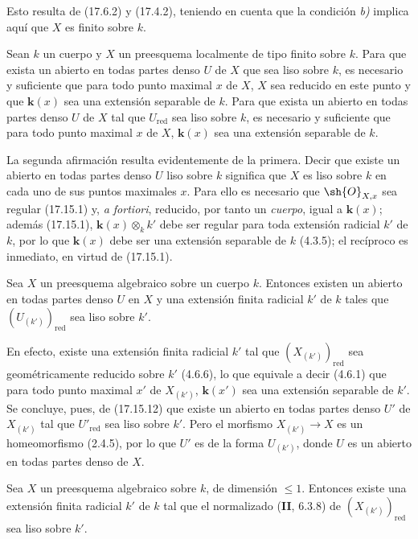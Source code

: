 Esto resulta de (17.6.2) y (17.4.2), teniendo en cuenta que la condición \emph{b)} implica aquí que $X$ es finito sobre $k$.

\begin{proposition}[17.15.12]
\label{IV.17.15.12}
Sean $k$ un cuerpo y $X$ un preesquema localmente de tipo finito sobre $k$. Para que exista un abierto en todas partes denso $U$ de $X$ que sea liso sobre $k$, es necesario y suficiente que para todo punto maximal $x$ de $X$, $X$ sea reducido en este punto y que $\boldsymbol k(x)$ sea una extensión separable de $k$. Para que exista un abierto en todas partes denso $U$ de $X$ tal que $U_{\mathrm{red}}$ sea liso sobre $k$, es necesario y suficiente que para todo punto maximal $x$ de $X$, $\boldsymbol k(x)$ sea una extensión separable de $k$.
\end{proposition}

La segunda afirmación resulta evidentemente de la primera. Decir que existe un abierto en todas partes denso $U$ liso sobre $k$ significa que $X$ es liso sobre $k$ en cada uno de sus puntos maximales $x$. Para ello es necesario que $\sh{O}_{X,x}$ sea regular (17.15.1) y, \emph{a fortiori}, reducido, por tanto un \emph{cuerpo}, igual a $\boldsymbol k(x)$; además (17.15.1), $\boldsymbol k(x)\otimes_k k'$ debe ser regular para toda extensión radicial $k'$ de $k$, por lo que $\boldsymbol k(x)$ debe ser una extensión separable de $k$ (4.3.5); el recíproco es inmediato, en virtud de (17.15.1).

\begin{corollary}[17.15.13]
\label{IV.17.15.13}
Sea $X$ un preesquema algebraico sobre un cuerpo $k$. Entonces existen un abierto en todas partes denso $U$ en $X$ y una extensión finita radicial $k'$ de $k$ tales que $(U_{(k')})_{\mathrm{red}}$ sea liso sobre $k'$.
\end{corollary}

En efecto, existe una extensión finita radicial $k'$ tal que $(X_{(k')})_{\mathrm{red}}$ sea geométricamente reducido sobre $k'$ (4.6.6), lo que equivale a decir (4.6.1) que para todo punto maximal $x'$ de $X_{(k')}$, $\boldsymbol k(x')$ sea una extensión separable de $k'$. Se concluye, pues, de (17.15.12) que existe un abierto en todas partes denso $U'$ de $X_{(k')}$ tal que $U'_{\mathrm{red}}$ sea liso sobre $k'$. Pero el morfismo $X_{(k')}\to X$ es un homeomorfismo (2.4.5), por lo que $U'$ es de la forma $U_{(k')}$, donde $U$ es un abierto en todas partes denso de $X$.

\begin{proposition}[17.15.14]
\label{IV.17.15.14}
Sea $X$ un preesquema algebraico sobre $k$, de dimensión $\leq1$. Entonces existe una extensión finita radicial $k'$ de $k$ tal que el normalizado \textup{(\textbf{II}, 6.3.8)} de $(X_{(k')})_{\mathrm{red}}$ sea liso sobre $k'$.
\end{proposition}

